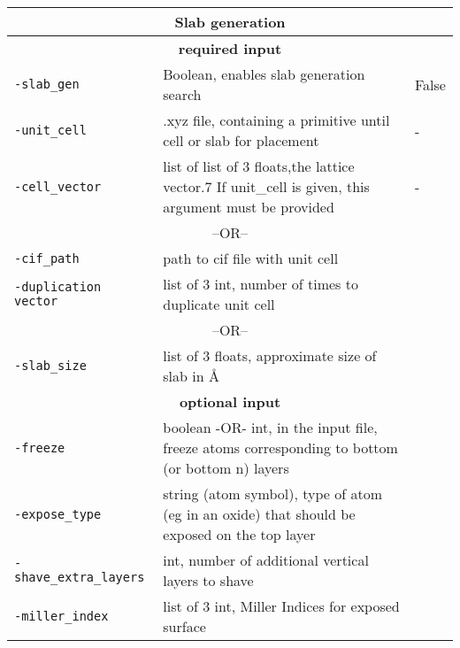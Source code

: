 \begin{tabular}{|p{4.5cm}|p{8cm}|p{3cm}|}
\hline
\multicolumn{3}{|c|}{\Large \textbf{Slab generation}}\\ \hline                        
\multicolumn{3}{|c|}{ \textbf{required input}}\\ \hline                        
\texttt{-slab\_gen} & Boolean, enables slab generation search & False \\
\texttt{-unit\_cell} & .xyz file,  containing a primitive until cell or slab for placement & - \\
\texttt{-cell\_vector} & list of list of 3 floats,the lattice vector.7 If unit\_cell is given, this argument must be provided
 & - \\
\multicolumn{3}{|c|}{ {--OR--}}\\      
\texttt{-cif\_path } & path to cif file with unit cell &  \\
\texttt{-duplication vector } & list of 3 int, number of times to duplicate unit cell &  \\
\multicolumn{3}{|c|}{ {--OR--}}\\    
\texttt{-slab\_size } & list of 3 floats, approximate size of slab in  \AA &  \\
\multicolumn{3}{|c|}{ \textbf{optional input}}\\ \hline                          
\texttt{-freeze } & boolean -OR- int, in the input file, freeze atoms corresponding to bottom (or bottom n) layers &  \\
\texttt{-expose\_type } & string (atom symbol), type of atom (eg in an oxide) that should be exposed on the top layer  &  \\
\texttt{-shave\_extra\_layers } & int, number of additional vertical layers to shave &  \\
\texttt{-miller\_index } & list of 3 int, Miller Indices for exposed surface
 &  \\
\hline
\end{tabular}
